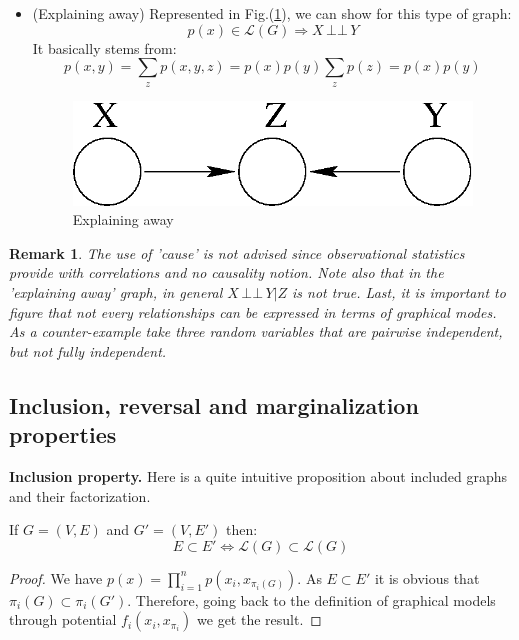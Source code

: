 \documentclass[12pt]{report}
\newcommand{\indep}{\ensuremath{\,\bot\!\!\!\bot\,}} %
\newtheorem{remark}{Remark}[section]
\begin{document}
\begin{itemize}
	\item (Explaining away) Represented in Fig.(\ref{fig3}), we can show for this type of graph:
	\begin{equation}
	 p(x) \in\mathcal{L}(G) \Rightarrow X\indep Y
	\label{eq:}
	\end{equation}
	It basically stems from:
	\begin{equation*}
		p(x,y) = \sum_z p(x,y,z) = p(x)p(y) \sum_z p(z) = p(x) p(y)
	\end{equation*}
	\begin{figure}[h!]
	\centering
	\includegraphics[scale=.75]{fig3.eps}
	\caption{Explaining away}
	\label{fig3}
	\end{figure}
\end{itemize}


\begin{remark}
The use of 'cause' is not advised since observational statistics provide with correlations and no causality notion. Note also that in the 'explaining away' graph, in general $X\indep Y | Z$ is not true. Last, it is important to figure that not every relationships can be expressed in terms of graphical modes. As a counter-example take three random variables that are pairwise independent, but not fully independent. 
\end{remark}


\subsection{Inclusion, reversal and marginalization properties}

\hspace{.5cm}\textbf{Inclusion property. }Here is a quite intuitive proposition about included graphs and their factorization.
\begin{proposition}
If $G = (V,E)$ and $G' = (V,E')$ then: 
\begin{equation}
E \subset E' \Leftrightarrow \mathcal{L}(G) \subset \mathcal{L}(G)
\label{eq:}
\end{equation}
\end{proposition}
\begin{proof}
We have $p(x) = \prod_{i=1}^n p(x_i, x_{\pi_i(G)})$. As $E \subset E'$ it is obvious that $\pi_i(G) \subset \pi_i(G')$. Therefore, going back to the definition of graphical models through potential $f_i(x_i,x_{\pi_i})$ we get the result.
\end{proof}
\end{document}
